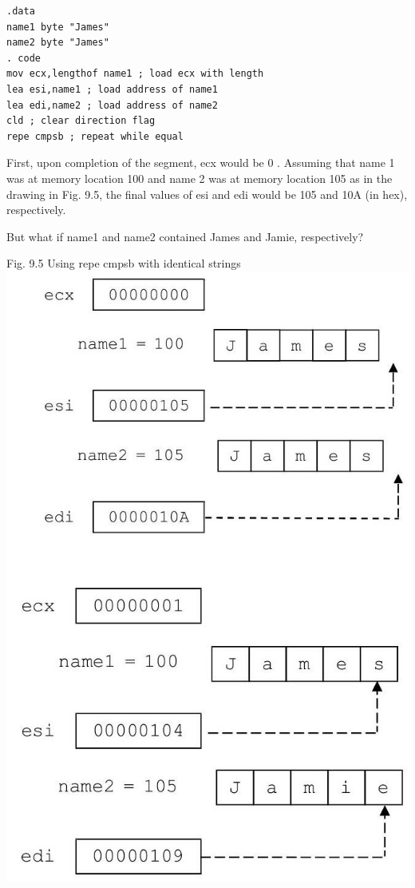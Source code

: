 \documentclass[10pt]{article}
\begin{document}
\begin{verbatim}
.data
name1 byte "James"
name2 byte "James"
. code
mov ecx,lengthof name1 ; load ecx with length
lea esi,name1 ; load address of name1
lea edi,name2 ; load address of name2
cld ; clear direction flag
repe cmpsb ; repeat while equal
\end{verbatim}

First, upon completion of the segment, ecx would be 0 . Assuming that name 1 was at memory location 100 and name 2 was at memory location 105 as in the drawing in Fig. 9.5, the final values of esi and edi would be 105 and 10A (in hex), respectively.

But what if name1 and name2 contained James and Jamie, respectively?

Fig. 9.5 Using repe cmpsb with identical strings\\
\includegraphics[max width=\textwidth, center]{2025_03_24_ebe50cc223a6fbc49eecg-210}
\end{document}
